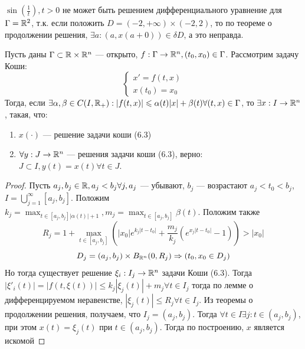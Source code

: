 \begin{example}
    \(\sin\left( \frac{1}{t} \right), t > 0\) не может быть решением дифференциального уравнение для \(\Gamma = \mathbb{R}^2\), т.к. если положить \(D = (-2, +\infty) \times (-2, 2)\), то по теореме о продолжении решения, \(\exists a: (a, x(a + 0)) \in \delta D\), а это неправда.
\end{example}

\begin{theorem}
    Пусть даны \(\Gamma \subset \mathbb{R} \times \mathbb{R}^n\) --- открыто, \(f: \Gamma \rightarrow \mathbb{R}^n, (t_0, x_0) \in \Gamma\). Рассмотрим задачу Коши:
    \begin{equation}
        \begin{cases}
            x' = f(t, x) \\
            x(t_0) = x_0
        \end{cases}
    \end{equation}
    Тогда, если \(\exists \alpha, \beta \in C(I, \mathbb{R}_+): |f(t, x)| \leqslant \alpha(t)|x| + \beta(t) \forall (t, x) \in \Gamma\), то \(\exists x: I \rightarrow \mathbb{R}^n\), такая, что:
    \begin{enumerate}
        \item \(x(\cdot)\) --- решение задачи коши (6.3)
        \item \(\forall y: J \rightarrow \mathbb{R}^n\) --- решения задачи коши (6.3), верно: \(J \subset I, y(t) = x(t) \forall t \in J\).
    \end{enumerate}
\end{theorem}
\begin{proof}
    Пусть \(a_j, b_j \in \mathbb{R}, a_j < b_j \forall j, a_j\) --- убывают, \(b_j\) --- возрастают \(a_j < t_0 < b_j\), \(I = \bigcup_{j = 1}^\infty [a_j, b_j]\). Положим \(k_j = \max_{t \in [a_j, b_j] |\alpha(t)| + 1}, m_j = \max_{t \in [a_j, b_j]} \beta(t)\). Положим также
    \[R_j = 1 + \max_{t \in [a_j, b_j]}\left( |x_0|e^{k_j|t - t_0|} + \frac{m_j}{k_j}\left( e^{x_j|t - t_0|} - 1 \right) \right) > |x_0|\]
    \[D_j = (a_j, b_j) \times B_{\mathbb{R}^n}(0, R_j) \Rightarrow (t_0, x_0 \in D_j)\]
    Но тогда существует решение \(\xi_i: I_j \rightarrow \mathbb{R}^n\) задачи Коши (6.3). Тогда \(|\xi'_i(t)| = |f(t, \xi(t))| \le k_j|\xi_j(t)| + m_j \forall t \in I_j\) тогда по лемме о дифференцируемом неравенстве, \(|\xi_j(t)| \le R_j \forall t \in I_j\). Из теоремы о продолжении решения, получаем, что \(I_j = (a_j, b_j)\). Тогда \(\forall t \in I \exists j: t \in (a_j, b_j)\), при этом \(x(t) = \xi_j(t)\) при \(t \in (a_j, b_j)\). Тогда по построению, \(x\) является искомой
\end{proof}

